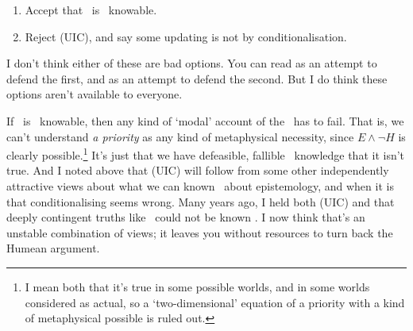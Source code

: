 \begin{enumerate}
\item Accept that \ECH\ is \apr\ knowable.
\item Reject (UIC), and say some updating is not by conditionalisation.
\end{enumerate}

\noindent I don't think either of these are bad options. You can read \citet{WeathersonSRE} as an attempt to defend the first, and \citet{Weatherson2007} as an attempt to defend the second. But I do think these options aren't available to everyone. 

If \ECH\ is \apr\ knowable, then any kind of `modal' account of the \apr\ has to fail. That is, we can't understand \textit{a priority} as any kind of metaphysical necessity, since $E \wedge \neg H$ is clearly possible.\footnote{I mean both that it's true in some possible worlds, and in some worlds considered as actual, so a `two-dimensional' equation of a priority with a kind of metaphysical possible is ruled out.} It's just that we have defeasible, fallible \apr\ knowledge that it isn't true. And I noted above that (UIC) will follow from some other independently attractive views about what we can known \apr\ about epistemology, and when it is that conditionalising seems wrong. Many years ago, I held both (UIC) and that deeply contingent truths like \ECH\ could not be known \apr. I now think that's an unstable combination of views; it leaves you without resources to turn back the Humean argument.
